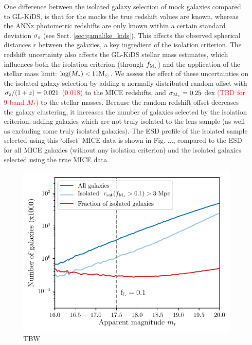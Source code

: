 \documentclass[usenatbib]{mnras}
\newcommand{\msun}{{\rm M_\odot}}
\newcommand{\un}[1]{_{\rm #1}}
\begin{document}
One difference between the isolated galaxy selection of mock galaxies compared to GL-KiDS, is that for the mocks the true redshift values are known, whereas the ANNz photometric redshifts are only known within a certain standard deviation $\sigma\un{z}$ (see Sect. \ref{sec:gamalike_kids}). This affects the observed spherical distances $r$ between the galaxies, a key ingredient of the isolation criterion. The redshift uncertainty also affects the GL-KiDS stellar mass estimates, which influences both the isolation criterion (through $f\un{M_*}$) and the application of the stellar mass limit: $\log(M_*)<11\msun$. We assess the effect of these uncertainties on the isolated galaxy selection by adding a normally distributed random offset with $\sigma\un{z}/(1+z) = 0.021$ \textcolor{red}{(0.018)} to the MICE redshifts, and $\sigma\un{M_*} = 0.25$ dex \textcolor{red}{(TBD for 9-band $M_*$)} to the stellar masses. Because the random redshift offset decreases the galaxy clustering, it increases the number of galaxies selected by the isolation criterion, adding galaxies which are not truly isolated to the lens sample (as well as excluding some truly isolated galaxies). The ESD profile of the isolated sample selected using this `offset' MICE data is shown in Fig. ..., compared to the ESD for all MICE galaxies (without any isolation criterion) and the isolated galaxies selected using the true MICE data.

\begin{figure}
	\includegraphics[width=1.0\columnwidth]{Figures/isolation_test_kids_perc0p1-3Mpc.pdf}
	\caption{TBW}
	\label{fig:isolation_test_fraction}
\end{figure}
\end{document}
